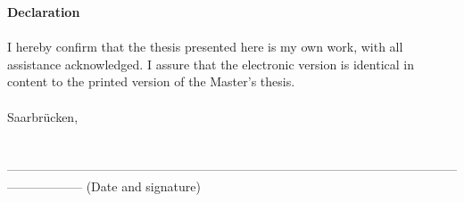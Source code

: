 \vspace*{\fill}

\noindent \textbf{Declaration}
\\
\\
\noindent I hereby confirm that the thesis presented here is my own work, with all assistance acknowledged. I assure that the electronic version is identical in content to the printed version of the Master’s thesis.
\\
\\
\noindent Saarbrücken,
\\
\\
\\
––––––––––––––––––––––––––––––––––––––––––––––––––––––––––––––––––––––––––––––––––––
(Date and signature)

\vspace*{\fill}
